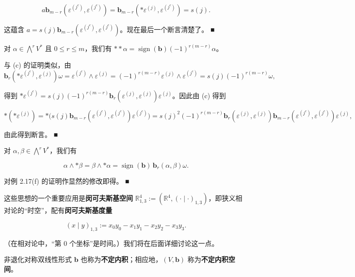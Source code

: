 \begin{remark}
\begin{items}
\[
a\mathbf{b}_{m-r}(\varepsilon^{(j^c)}, \varepsilon^{(j^c)}) = \mathbf{b}_{m-r}(\ast\varepsilon^{(j)}, \varepsilon^{(j^c)}) = s(j) .
\]

这蕴含 $ a = s(j)\mathbf{b}_{m-r}(\varepsilon^{(j^c)}, \varepsilon^{(j^c)}) $。现在最后一个断言清楚了。 \nobreak\hspace{0.35em}■

\item

对 $ \alpha \in \bigwedge^r V^* $ 且 $ 0 \le r \le m $，我们有 $ \ast\ast\alpha = \operatorname{sign}(\mathbf{b})(-1)^{r(m-r)}\alpha $。

\proofhead
与 (c) 的证明类似，由
\[
\mathbf{b}_r(\ast\varepsilon^{(j^c)}, \varepsilon^{(j)})\omega = \varepsilon^{(j^c)} \wedge \varepsilon^{(j)} = (-1)^{r(m-r)}\varepsilon^{(j)} \wedge \varepsilon^{(j^c)} = s(j)(-1)^{r(m-r)}\omega ,
\]

得到 $ \ast\varepsilon^{(j^c)} = s(j)(-1)^{r(m-r)}\mathbf{b}_r(\varepsilon^{(j)}, \varepsilon^{(j)})\varepsilon^{(j)} $。因此由 (c) 得到

\[
\ast(\ast\varepsilon^{(j)}) = \ast\bigl(s(j)\mathbf{b}_{m-r}(\varepsilon^{(j^c)}, \varepsilon^{(j^c)})\varepsilon^{(j^c)}\bigr) = s(j)^2(-1)^{r(m-r)}\mathbf{b}_r(\varepsilon^{(j)}, \varepsilon^{(j)})\mathbf{b}_{m-r}(\varepsilon^{(j^c)}, \varepsilon^{(j^c)})\varepsilon^{(j)} ,
\]

由此得到断言。 \nobreak\hspace{0.35em}■

\item

对 $ \alpha, \beta \in \bigwedge^r V^* $，我们有

\[
\alpha \wedge \ast\beta = \beta \wedge \ast\alpha = \operatorname{sign}(\mathbf{b})\, \mathbf{b}_r(\alpha, \beta)\omega .
\]

\proofhead
对例 2.17(f) 的证明作显然的修改即得。 \nobreak\hspace{0.35em}■
\end{items}

这些思想的一个重要应用是\textbf{闵可夫斯基空间} $ \mathbb{R}^{4}_{1,3} := (\mathbb{R}^4, (\cdot \mid \cdot)_{1,3}) $，即狭义相对论的“时空”，配有\textbf{闵可夫斯基度量}

\[
(x \mid y)_{1,3} := x_0 y_0 - x_1 y_1 - x_2 y_2 - x_3 y_3 .
\]

（在相对论中，“第 0 个坐标”是时间。）我们将在后面详细讨论这一点。

非退化对称双线性形式 $ \mathbf{b} $ 也称为\textbf{不定内积}；相应地，$ (V, \mathbf{b}) $ 称为\textbf{不定内积空间}。

\end{remark}

